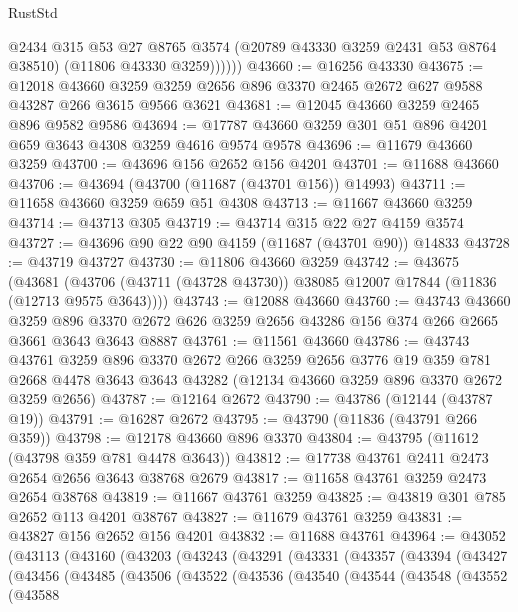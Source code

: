 \begin{lexlean}{RustStd}
\begin{coremodule}
              @2434
              @315
              @53
              @27
              @8765
              @3574
              (@20789 @43330 @3259 @2431 @53 @8764 @38510)
              (@11806 @43330 @3259))))))
@43660 := @16256 @43330
@43675 := @12018
    @43660
    @3259
    @3259
    @2656
    @896
    @3370
    @2465
    @2672
    @627
    @9588
    @43287
    @266
    @3615
    @9566
    @3621
@43681 := @12045 @43660 @3259 @2465 @896 @9582 @9586
@43694 := @17787 @43660 @3259 @301 @51 @896 @4201 @659 @3643 @4308 @3259 @4616 @9574 @9578
@43696 := @11679 @43660 @3259
@43700 := @43696 @156 @2652 @156 @4201
@43701 := @11688 @43660
@43706 := @43694 (@43700 (@11687 (@43701 @156)) @14993)
@43711 := @11658 @43660 @3259 @659 @51 @4308
@43713 := @11667 @43660 @3259
@43714 := @43713 @305
@43719 := @43714 @315 @22 @27 @4159 @3574
@43727 := @43696 @90 @22 @90 @4159 (@11687 (@43701 @90)) @14833
@43728 := @43719 @43727
@43730 := @11806 @43660 @3259
@43742 := @43675
    (@43681 (@43706 (@43711 (@43728 @43730)) @38085 @12007 @17844 (@11836 (@12713 @9575 @3643))))
@43743 := @12088 @43660
@43760 := @43743
    @43660
    @3259
    @896
    @3370
    @2672
    @626
    @3259
    @2656
    @43286
    @156
    @374
    @266
    @2665
    @3661
    @3643
    @3643
    @8887
@43761 := @11561 @43660
@43786 := @43743
    @43761
    @3259
    @896
    @3370
    @2672
    @266
    @3259
    @2656
    @3776
    @19
    @359
    @781
    @2668
    @4478
    @3643
    @3643
    @43282
    (@12134 @43660 @3259 @896 @3370 @2672 @3259 @2656)
@43787 := @12164 @2672
@43790 := @43786 (@12144 (@43787 @19))
@43791 := @16287 @2672
@43795 := @43790 (@11836 (@43791 @266 @359))
@43798 := @12178 @43660 @896 @3370
@43804 := @43795 (@11612 (@43798 @359 @781 @4478 @3643))
@43812 := @17738 @43761 @2411 @2473 @2654 @2656 @3643 @38768 @2679
@43817 := @11658 @43761 @3259 @2473 @2654 @38768
@43819 := @11667 @43761 @3259
@43825 := @43819 @301 @785 @2652 @113 @4201 @38767
@43827 := @11679 @43761 @3259
@43831 := @43827 @156 @2652 @156 @4201
@43832 := @11688 @43761
@43964 := @43052
    (@43113
      (@43160
        (@43203
          (@43243
            (@43291
              (@43331
                (@43357
                  (@43394
                    (@43427
                      (@43456
                        (@43485
                          (@43506
                            (@43522
                              (@43536
                                (@43540
                                  (@43544
                                    (@43548
                                      (@43552
                                        (@43588

\end{coremodule}
\end{lexlean}

